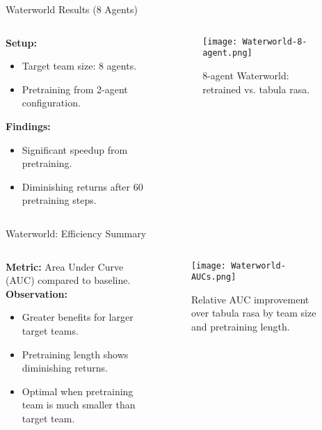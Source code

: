 \begin{frame}{Waterworld Results (8 Agents)}
    \begin{columns}
        \begin{column}{0.35\linewidth}
            \textbf{Setup:}
            \begin{itemize}
                \item Target team size: 8 agents.
                \item Pretraining from 2-agent configuration.
            \end{itemize}
            \textbf{Findings:}
            \begin{itemize}
                \item Significant speedup from pretraining.
                \item Diminishing returns after 60 pretraining steps.
            \end{itemize}
        \end{column}
        \begin{column}{0.65\linewidth}
            \begin{figure}
                \texttt{[image: Waterworld-8-agent.png]}
                \caption{8-agent Waterworld: retrained vs. tabula rasa.}
            \end{figure}
        \end{column}
    \end{columns}
\end{frame}


\begin{frame}{Waterworld: Efficiency Summary}
    \begin{columns}
        \begin{column}{0.45\linewidth}
            \textbf{Metric:} Area Under Curve (AUC) compared to baseline. \\
            \textbf{Observation:}
            \begin{itemize}
                \item Greater benefits for larger target teams.
                \item Pretraining length shows diminishing returns.
                \item Optimal when pretraining team is much smaller than target team.
            \end{itemize}
        \end{column}
        \begin{column}{0.55\linewidth}
            \begin{figure}
                \texttt{[image: Waterworld-AUCs.png]}
                \caption{Relative AUC improvement over tabula rasa by team size and pretraining length.}
            \end{figure}
        \end{column}
    \end{columns}
\end{frame}

